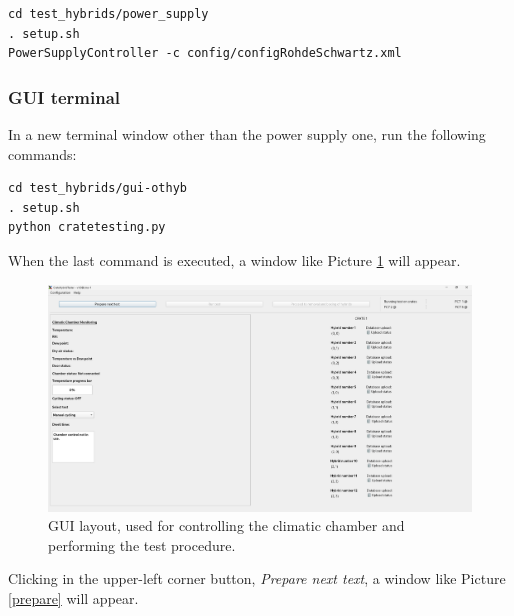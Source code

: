 \documentclass[10pt,a4paper]{article}
\begin{document}
\begin{framed}
\begin{verbatim}
cd test_hybrids/power_supply
. setup.sh
PowerSupplyController -c config/configRohdeSchwartz.xml
\end{verbatim}
\end{framed}

\subsubsection{GUI terminal}

In a new terminal window other than the power supply one, run the following commands:

\begin{framed}
\begin{verbatim}
cd test_hybrids/gui-othyb
. setup.sh 
python cratetesting.py
\end{verbatim}
\end{framed}


When the last command is executed, a window like Picture \ref{GUIlayout} will appear.

\begin{figure}[h!]
\centering
 \includegraphics[width=\linewidth]{Pictures/GUI.png} 
  \caption{GUI layout, used for controlling the climatic chamber and performing the test procedure.}
  \label{GUIlayout}
\end{figure}

Clicking in the upper-left corner button, \textit{Prepare next text}, a window like Picture \ref{prepare} will appear.
\end{document}
